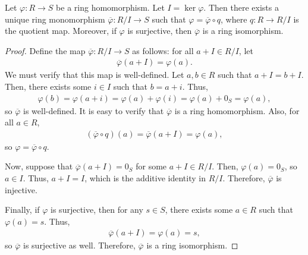\begin{theorem}
    Let $\varphi : R \to S$ be a ring homomorphism. Let $I = \ker \varphi$. Then there exists a unique ring monomorphism $\overline{\varphi} : R/I \to S$ such that $\varphi = \overline{\varphi} \circ q$, where $q : R \to R/I$ is the quotient map. Moreover, if $\varphi$ is surjective, then $\overline{\varphi}$ is a ring isomorphism.
\end{theorem}
\begin{proof}
    Define the map $\overline{\varphi} : R/I \to S$ as follows: for all $a + I \in R/I$, let
    \begin{align}
        \overline{\varphi}(a + I) = \varphi(a).
    \end{align}
    We must verify that this map is well-defined. Let $a, b \in R$ such that $a + I = b + I$. Then, there exists some $i \in I$ such that $b = a + i$. Thus,
    \begin{align}
        \varphi(b) = \varphi(a + i) = \varphi(a) + \varphi(i) = \varphi(a) + 0_{S} = \varphi(a),
    \end{align}
    so $\overline{\varphi}$ is well-defined. It is easy to verify that $\overline{\varphi}$ is a ring homomorphism. Also, for all $a \in R$,
    \begin{align}
        (\overline{\varphi} \circ q)(a) = \overline{\varphi}(a + I) = \varphi(a),
    \end{align}
    so $\varphi = \overline{\varphi} \circ q$.

    Now, suppose that $\overline{\varphi}(a + I) = 0_{S}$ for some $a + I \in R/I$. Then, $\varphi(a) = 0_{S}$, so $a \in I$. Thus, $a + I = I$, which is the additive identity in $R/I$. Therefore, $\overline{\varphi}$ is injective.

    Finally, if $\varphi$ is surjective, then for any $s \in S$, there exists some $a \in R$ such that $\varphi(a) = s$. Thus,
    \begin{align}
        \overline{\varphi}(a + I) = \varphi(a) = s,
    \end{align}
    so $\overline{\varphi}$ is surjective as well. Therefore, $\overline{\varphi}$ is a ring isomorphism.
\end{proof}

